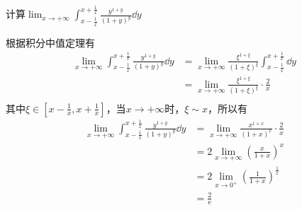 \begin{example}
    计算$\displaystyle\lim_{x\to+\infty}\int_{x-\frac{1}{x}}^{x+\frac{1}{x}}\frac{y^{1+y}}{(1+y)^y}\dd{y}$
\end{example}
\begin{solution}
    根据积分中值定理有
    \begin{align*}
        \lim_{x\to+\infty}\int_{x-\frac{1}{x}}^{x+\frac{1}{x}}\frac{y^{1+y}}{(1+y)^y}\dd{y}
         & = \lim_{x\to+\infty} \frac{\xi^{1+\xi}}{(1+\xi)^\xi} \int_{x-\frac{1}{x}}^{x+\frac{1}{x}}\dd{y} \\
         & = \lim_{x\to+\infty} \frac{\xi^{1+\xi}}{(1+\xi)^\xi} \cdot \frac{2}{x}                          \\
    \end{align*}
    其中$\xi\in[x-\frac{1}{x},x+\frac{1}{x}]$，当$x\to+\infty$时，$\xi \sim x$，所以有
    \begin{align*}
        \lim_{x\to+\infty}\int_{x-\frac{1}{x}}^{x+\frac{1}{x}}\frac{y^{1+y}}{(1+y)^y}\dd{y}
         & = \lim_{x\to+\infty} \frac{x^{1+x}}{(1+x)^x} \cdot \frac{2}{x} \\
         & = 2\lim_{x\to+\infty} \left(\frac{x}{1+x}\right)^x             \\
         & = 2\lim_{x\to 0^+} \left(\frac{1}{1+x}\right)^\frac{1}{x}      \\
         & =\frac{2}{\mathrm{e}}
    \end{align*}
\end{solution}


